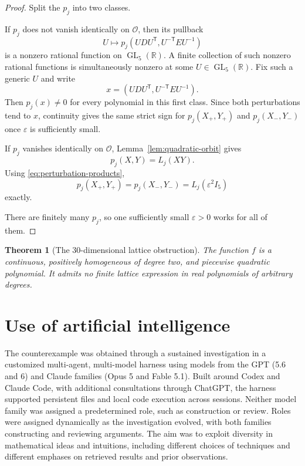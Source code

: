 \documentclass[11pt]{amsart}
\newtheorem{theorem}{Theorem}
\theoremstyle{remark}
\DeclareMathOperator{\GL}{GL}
\newcommand{\tp}{{\scriptscriptstyle\mathsf{T}}}
\begin{document}
\begin{proof}
Split the $p_j$ into two classes.

If $p_j$ does not vanish identically on $\mathcal O$, then its pullback
\[
U\longmapsto p_j(UDU^\tp ,U^{-\tp} EU^{-1})
\]
is a nonzero rational function on $\GL_5(\mathbb R)$. A finite collection of such nonzero rational functions is simultaneously nonzero at some $U\in\GL_5(\mathbb R)$. Fix such a generic $U$ and write
\[
x=(UDU^\tp ,U^{-\tp} EU^{-1}).
\]
Then $p_j(x)\ne0$ for every polynomial in this first class. Since both perturbations tend to $x$, continuity gives the same strict sign for $p_j(X_+,Y_+)$ and $p_j(X_-,Y_-)$ once $\varepsilon$ is sufficiently small.

If $p_j$ vanishes identically on $\mathcal O$, Lemma~\ref{lem:quadratic-orbit} gives
\[
p_j(X,Y)=L_j(XY).
\]
Using \eqref{eq:perturbation-products},
\[
p_j(X_+,Y_+)=p_j(X_-,Y_-)=L_j(\varepsilon^2I_5)
\]
exactly.

There are finitely many $p_j$, so one sufficiently small $\varepsilon>0$ works for all of them.
\end{proof}

\begin{theorem}[The 30-dimensional lattice obstruction]
The function $f$ is a continuous, positively homogeneous of degree two, and piecewise quadratic polynomial. It admits no finite lattice expression in real polynomials of arbitrary degrees.
\end{theorem}


\section{Use of artificial intelligence}\label{sec:ai-usage}

The counterexample was obtained through a sustained investigation in a customized multi-agent, multi-model harness using models from the GPT (5.6 and 6) and Claude families (Opus 5 and Fable 5.1). Built around Codex and Claude Code, with additional consultations through ChatGPT, the harness supported persistent files and local code execution across sessions. Neither model family was assigned a predetermined role, such as construction or review. Roles were assigned dynamically as the investigation evolved, with both families constructing and reviewing arguments. The aim was to exploit diversity in mathematical ideas and intuitions, including different choices of techniques and different emphases on retrieved results and prior observations.
\end{document}
